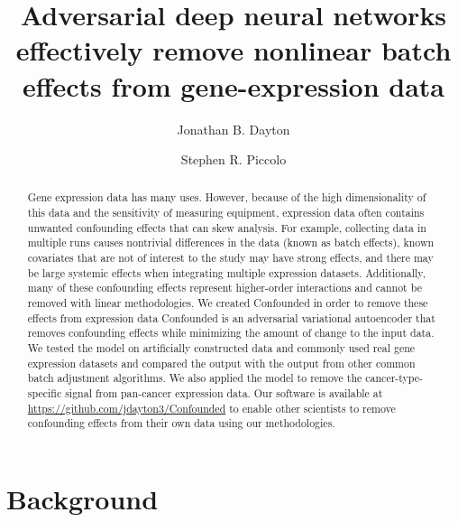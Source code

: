 \documentclass[notitlepage]{article}
\begin{document}
\title{Adversarial deep neural networks effectively remove nonlinear batch effects from gene-expression data}
\author[1]{Jonathan B. Dayton}
\author[1]{Stephen R. Piccolo}
\date{}

\maketitle

\begin{abstract}
	Gene expression data has many uses.
	However, because of the high dimensionality of this data and the sensitivity of measuring equipment, expression data often contains unwanted confounding effects that can skew analysis.
	For example, collecting data in multiple runs causes nontrivial differences in the data (known as batch effects),
	known covariates that are not of interest to the study may have strong effects,
	and there may be large systemic effects when integrating multiple expression datasets.
	Additionally, many of these confounding effects represent higher-order interactions and cannot be removed with linear methodologies.
	We created Confounded in order to remove these effects from expression data
	Confounded is an adversarial variational autoencoder that removes confounding effects while minimizing the amount of change to the input data.
	We tested the model on artificially constructed data and commonly used real gene expression datasets and compared the output with the output from other common batch adjustment algorithms.
	We also applied the model to remove the cancer-type-specific signal from pan-cancer expression data.
	Our software is available at \url{https://github.com/jdayton3/Confounded} to enable other scientists to remove confounding effects from their own data using our methodologies.
\end{abstract}

\section{Background} \label{sec:background}
\end{document}
